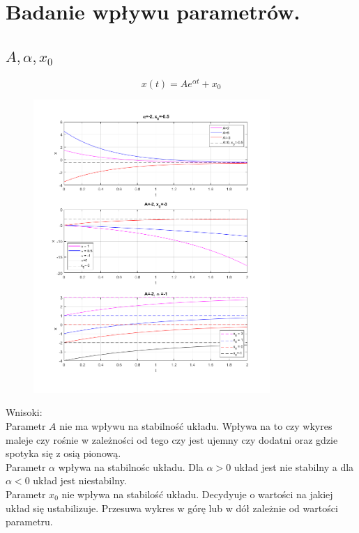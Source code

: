 \documentclass{article}
\begin{document}
\newpage
\section{Badanie wpływu parametrów.}
\subsection{$A,\alpha,x_0$}
$$
x(t)=Ae^{\alpha t}+x_0
$$

\begin{figure}[h]
    \centering
    \includegraphics[width=0.8\textwidth]{a_graphs.png}
    \label{fig:my_label}
\end{figure}
\begin{flushleft}
Wnisoki:\\
Parametr $A$ nie ma wpływu na stabilność układu. Wpływa na to czy wkyres maleje czy rośnie w zależności od tego czy jest ujemny czy dodatni oraz gdzie spotyka się z osią pionową.\\
Parametr $\alpha$ wpływa na stabilnośc układu. Dla $\alpha > 0$ układ jest nie stabilny a dla $\alpha < 0 $ układ jest niestabilny.\\
Parametr $x_0$ nie wpływa na stabilość układu. Decydyuje o wartości na jakiej układ się ustabilizuje. Przesuwa wykres w górę lub w dół zależnie od wartości parametru.
\end{flushleft}
\end{document}
